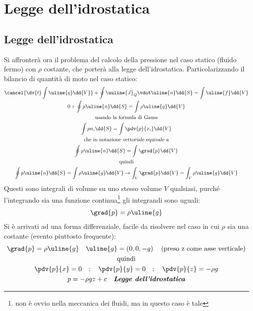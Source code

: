 %
\section{Legge dell'idrostatica}
%
\subsection{Legge dell'idrostatica}
Si affronterà ora il problema del calcolo della pressione nel caso statico (fluido fermo) con $\rho$ costante, che porterà alla legge dell'idrostatica.
Particolarizzando il bilancio di quantità di moto nel caso statico: 
	\begin{equation*}
		\begin{gathered}
			\cancel{\dv{t} \int{\uline{q} \dd{V}}} + \oint{\uuline{J}_Q \vdot \uline{n} \dd{S}} = \int{\uline{f} \dd{V}}\\
			0 + \oint{p \uline{n} \dd{S}} = \int{\rho \uline{g} \dd{V}}\\
			\text{usando la formula di Gauss}\\
			\int{p n_i \dd{S}} = \int{ \pdv{p}{x_i} \dd{V}}\\
			\text{che in notazione vettoriale equivale a} \\
			\oint{p \uline{n} \dd{S}} = \int{ \grad{p} \dd{V}} \\
			\text{quindi}\\
			\oint{p \uline{n} \dd{S}} = \int{\rho \uline{g} \dd{V}} \to \int_{V} {\grad{p} \dd{V}} = \int_{V} {\rho \uline{g} \dd{V}}
		\end{gathered}
	\end{equation*}
Questi sono integrali di volume su uno stesso volume $V$ qualsiasi, purché l'integrando sia una funzione continua\footnote{non è ovvio nella meccanica dei fluidi, ma in questo caso è tale} gli integrandi sono uguali:
	\begin{equation*}
		\grad{p} = \rho \uline{g}
	\end{equation*}
Si è arrivati ad una forma differenziale, facile da risolvere nel caso in cui $\rho$ sia una costante (evento piuttosto frequente):
	\begin{equation*}
		\begin{gathered}
			\grad{p} = \rho \uline{g} \quad \uline{g} = \left( 0, 0, -g \right) \quad \text{(preso z come asse verticale)}\\
			\text{quindi}\\
			\pdv{p}{x} = 0 \quad ; \quad \pdv{p}{y} = 0 \quad ; \quad \pdv{p}{z} = - \rho g\\
			p = - \rho g z + c \quad \textit{\textbf{Legge dell'idrostatica}}
		\end{gathered}
	\end{equation*}
